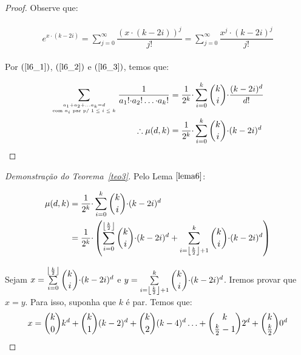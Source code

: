 \documentclass[12pt]{article}
\begin{document}
{\begin{proof}
 Observe que:
 
  \begin{align}
 	\begin{split}
 		\label{l6_3}
 		e^{x {\cdot}(k - 2i)} = \sum\limits_{j = 0}^{\infty} \dfrac{(x {\cdot}(k - 2i))^j}{j!} = \sum\limits_{j = 0}^{\infty} \dfrac{x^j {\cdot}(k - 2i)^j}{j!}
 	\end{split} 
 \end{align}
 
 Por $(\ref{l6_1})$, $(\ref{l6_2})$ e $(\ref{l6_3})$, temos que:
 
  \begin{align}
 	\begin{split} 
 		\sum\limits_{a_1 + a_2 + \ldots a_k = d \atop \text{com $a_i$ par p/ $1 \leq i \leq k$}} \dfrac{1}{a_1! {\cdot} a_2! \ldots {\cdot} a_k!} &= \dfrac{1}{2^k} {\cdot} \sum\limits_{i = 0}^{k}\escolhe{k}{i} {\cdot} \dfrac{(k - 2i)^{d}}{d!} \\
 		\therefore \mu(d, k) &= \dfrac{1}{2^k} {\cdot} \sum\limits_{i = 0}^{k}\escolhe{k}{i} {\cdot} (k - 2i)^{d}
 	\end{split} 
 \end{align}
 
 \end{proof}
 
 \begin{proof}[Demonstração do Teorema~\ref{teo3}]
 	Pelo Lema $\ref{lema6}$:
 	
 	\begin{align}
 		\begin{split} 
 			 \mu(d, k) &= \dfrac{1}{2^k} {\cdot} \sum\limits_{i = 0}^{k}\escolhe{k}{i} {\cdot} (k - 2i)^{d} \\
 			 &= \dfrac{1}{2^k} {\cdot} \left(  \sum\limits_{i = 0}^{ \blfloor \frac{k}{2} \brfloor  }\escolhe{k}{i} {\cdot} (k - 2i)^{d} +   \sum\limits_{i = \blfloor \frac{k}{2} \brfloor + 1  }^{k}\escolhe{k}{i} {\cdot} (k - 2i)^{d} \right)
 		\end{split} 
 	\end{align}
 	
 	Sejam $x = \sum\limits_{i = 0}^{ \blfloor \frac{k}{2} \brfloor  }\escolhe{k}{i} {\cdot} (k - 2i)^{d} $ e $y = \sum\limits_{i = \blfloor \frac{k}{2} \brfloor + 1  }^{k}\escolhe{k}{i} {\cdot} (k - 2i)^{d}$. Iremos provar que $x=y$. Para isso, suponha que $k$ é par. Temos que: 
 	\begin{align}
 		\begin{split}  
 			x = \escolhe{k}{0}k^{d} + \escolhe{k}{1}(k-2)^{d} + \escolhe{k}{2}(k-4)^{d} \ldots + \escolhe{k}{\frac{k}{2} - 1}2^{d} + \escolhe{k}{\frac{k}{2}}0^{d}
 		\end{split} 
 	\end{align}
 	

\end{proof}}
\end{document}
